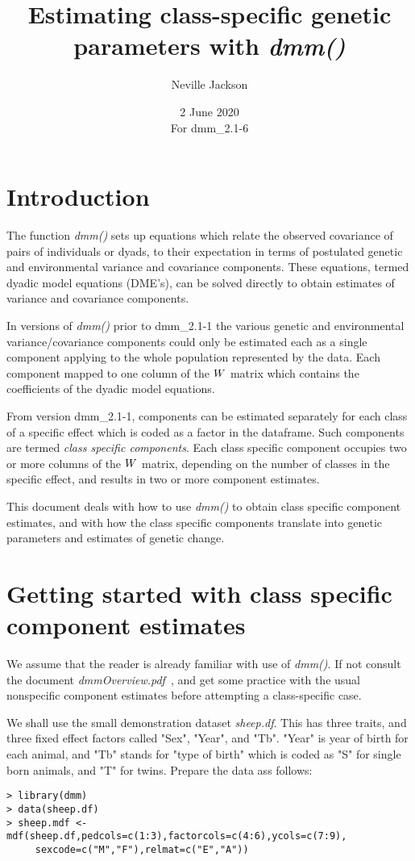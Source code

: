 \documentclass[titlepage]{article}  %
\title{ Estimating class-specific genetic parameters with {\em dmm()}}
\author{Neville Jackson }
\date{2 June 2020 \\
      For dmm\_2.1-6}   %
\begin{document}
 
 
\maketitle      
\tableofcontents

\section{Introduction} 
The function {\em dmm()} sets up equations which relate the observed covariance of pairs of individuals or dyads, to their expectation in terms of postulated genetic and environmental variance and covariance components.  These equations, termed dyadic model equations (DME's), can be solved directly to obtain estimates of variance and covariance components.  

In versions of {\em dmm()} prior to dmm\_2.1-1 the various genetic and environmental variance/covariance components could only be estimated each as a single component applying to the whole population represented by the data. Each component mapped to one column of the $\boldmath W$ matrix which contains the coefficients of the dyadic model equations.

From version dmm\_2.1-1, components can be estimated separately for each class of a specific effect which is coded as a factor in the dataframe. Such components are termed {\em class specific components}. Each class specific component occupies two or more columns of the $\boldmath W$ matrix, depending on the number of classes in the specific effect, and results in two or more component estimates.

This document deals with how to use {\em dmm()} to obtain class specific component estimates, and with how the class specific components translate into genetic parameters and estimates of genetic change.


 
\section{Getting started with class specific component estimates}
\label{sec:getstart}
 We assume that the reader is already familiar with use of {\em dmm()}. If not consult the document {\em dmmOverview.pdf}~\cite{jack:15}, and get some practice with the usual nonspecific component estimates before attempting a class-specific case.

 We shall use the small demonstration dataset {\em sheep.df}. This has three traits, and three fixed effect factors called "Sex", "Year", and "Tb". "Year" is year of birth for each animal, and "Tb" stands for "type of birth" which is coded as "S" for single born animals, and "T" for twins.  Prepare the data ass follows:
\begin{verbatim}
> library(dmm)
> data(sheep.df)
> sheep.mdf <- mdf(sheep.df,pedcols=c(1:3),factorcols=c(4:6),ycols=c(7:9),
     sexcode=c("M","F"),relmat=c("E","A"))
\end{verbatim}
\end{document}

